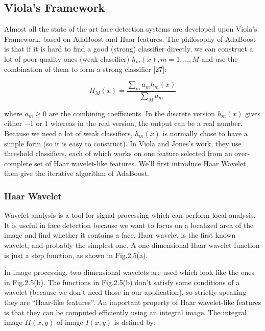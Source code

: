 \documentclass[12pt, twoside]{report}
\begin{document}
	\newpage

	\subsection{Viola's Framework}
	\par
	Almost all the state of the art face detection systems are developed upon Viola’s Framework, based on AdaBoost and Haar features. The philosophy of AdaBoost is that if it is hard to find a good (strong) classifier directly, we can construct a lot of poor quality ones (weak classifier) $h_m (x) ,m = 1, . . . , M$ and use the combination of them to form a strong classifier [27]:

	\begin{equation}
		H_M(x) = \frac{\sum_m{a_mh_m(x)}}{\sum_M{a_m}}
	\end{equation}

	where $a_m ≥ 0$ are the combining coefficients. In the discrete version $h_m(x)$ gives either $−1$
	or $1$ whereas in the real version, the output can be a real number. Because we need a lot of weak classifiers, $h_m(x)$ is normally chose to have a simple form (so it is easy to construct). In Viola and Jones’s work, they use threshold classifiers, each of which works on one feature selected from an over-complete set of Haar wavelet-like features. We’ll first introduce Haar Wavelet, then give the iterative algorithm of AdaBoost.

	\subsubsection{Haar Wavelet}

	\par
	Wavelet analysis is a tool for signal processing which can perform local analysis. It is useful in face detection because we want to focus on a localized area of the image and find whether it contains a face. Haar wavelet is the first known wavelet, and probably the simplest one. A one-dimensional Haar wavelet function is just a step function, as shown in Fig.2.5(a).

	\par
	In image processing, two-dimensional wavelets are used which look like the ones in Fig.2.5(b). The functions in Fig.2.5(b) don’t satisfy some conditions of a wavelet (because we don’t need those in our application), so strictly speaking they are ``Haar-like features''. An important property of Haar wavelet-like features is that they can be computed efficiently using an integral image. The integral image $II(x, y)$ of image $I(x, y)$ is
	defined by:
\end{document}
